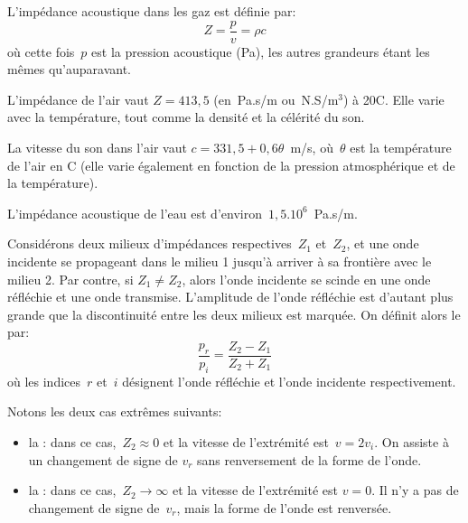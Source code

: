 \medskip
L'impédance acoustique dans les gaz est définie par:
\begin{equation}
Z = \dfrac{p}{v}=\rho c
\end{equation}
où cette fois~$p$ est la pression acoustique (Pa), les autres grandeurs étant les mêmes qu'auparavant.

\begin{remarque}
L'impédance de l'air vaut $Z=413,5$ (en~Pa.s/m ou~N.S/m$^3$) à 20\degre C. Elle varie avec la température, tout comme la densité et la célérité du son.

La vitesse du son dans l'air vaut $c=331,5+0,6\theta$~m/s, où~$\theta$ est la température de l'air en \degre C (elle varie également en fonction de la pression atmosphérique et de la température).

L'impédance acoustique de l'eau est d'environ~$1,5.10^6$~Pa.s/m.
\end{remarque}

Considérons deux milieux d'impédances respectives~$Z_1$ et~$Z_2$, et une onde incidente se propageant dans le milieu 1 jusqu'à arriver à sa frontière avec le milieu 2.
Par contre, si $Z_1\ne Z_2$, alors l'onde incidente se scinde en une onde réfléchie et une onde transmise. L'amplitude de l'onde réfléchie est d'autant plus grande que la discontinuité entre les deux milieux est marquée.
On définit alors le  par:
\begin{equation}
\dfrac{p_r}{p_i}=\dfrac{Z_2-Z_1}{Z_2+Z_1}
\end{equation}
où les indices~$r$ et~$i$ désignent l'onde réfléchie et l'onde incidente respectivement.

\medskip{}%

\medskip{}
Notons les deux cas extrêmes suivants:
\begin{itemize}
   \item la : dans ce cas,~$Z_2\approx0$ et la vitesse de l'extrémité est~$v=2v_i$. On assiste à un changement de signe de $v_r$ sans renversement de la forme de l'onde.
   \item la : dans ce cas,~$Z_2\rightarrow\infty$ et la vitesse de l'extrémité est $v=0$. Il n'y a pas de changement de signe de~$v_r$, mais la forme de l'onde est renversée.
\end{itemize}







